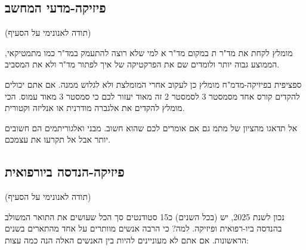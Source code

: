 \documentclass[a4paper,12pt]{article}
\begin{document}
\subsection{פיזיקה-מדעי המחשב}

(תודה לאנונימי על הסעיף)

מומלץ לקחת את מד"ר ת במקום מד"ר א למי שלא רוצה להתעמק במד"ר כמו מתמטיקאי, הממוצע גבוה יותר ולומדים שם את הפרקטיקה של איך לפתור מד"ר ולא את המסביב.

ספציפית בפיזיקה-מדמ"ח מומלץ כן לעקוב אחרי המומלצת ולא לגלוש ממנה. אם אתם יכולים להקדים קורס אחד מסמסטר 3 לסמסטר 2 זה מאוד יעזור לכם כי סמסטר 3 מאוד עמוס. הכי מומלץ להקדים את אלגברה מודרנית או אנליזה וקטורית.

אל תדאגו מהציון של מתמ גם אם אומרים לכם שהוא חשוב. מבני ואלגוריתמים הם חשובים יותר אבל אל תקרעו את עצמכם.

\subsection{פיזיקה-הנדסה ביורפואית}

(תודה לאנונימי על הסעיף)

נכון לשנת 2025, יש (בכל השנים) כ15 סטודנטים סך הכל שעושים את התואר המשולב בהנדסה ביו-רפואית ופיזיקה. למה? כי הרבה אנשים מוותרים על אחד מהתארים בשנים הראשונות. אם אתם לא מעוניינים להיות בין האנשים האלה הנה כמה עצות:
\end{document}
